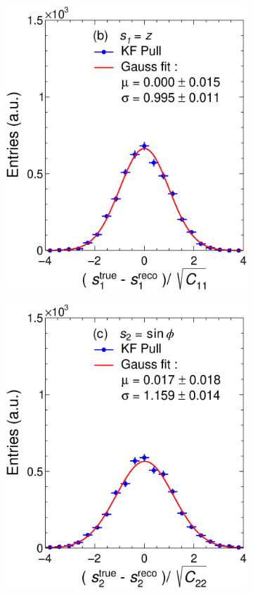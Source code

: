 \begin{figure}[t]
\begin{subfigure}{0.32\textwidth}
         \includegraphics[width=\textwidth]{figures/ch4-KF_NDGArLite/Toy/Corr/UnitKFEnd_p1.eps}
         \caption{}
         \label{fig:resp1KF_GArLite_Corr}
     \end{subfigure}
    \begin{subfigure}{0.32\textwidth}
         \centering
         \includegraphics[width=\textwidth]{figures/ch4-KF_NDGArLite/Toy/Corr/UnitKFEnd_p2.eps}

\end{subfigure}
\end{figure}
